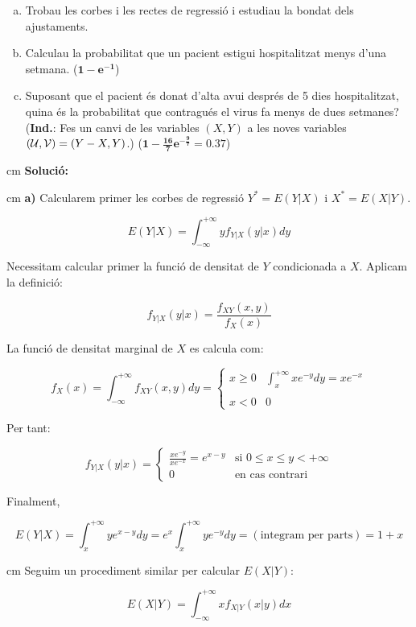 \documentclass{article}
\begin{document}
\begin{enumerate}[a)]
\item Trobau les corbes i les rectes de regressi\'o i estudiau la
bondat dels ajustaments.
\item Calculau la probabilitat que un pacient estigui hospitalitzat
menys d'una setmana. ($\mathbf{1-{ e}^{-1}}$)
\item Suposant que el pacient \'es donat d'alta avui despr\'es de 5 dies
hospitalitzat, quina \'es la probabilitat que contragu\'es el virus fa
menys de dues setmanes? ({\bf Ind.}: Fes un canvi de les variables
$(X,Y)$ a les noves variables $({\cal U},{\cal V}) = (Y - X, Y)$.)
($\mathbf{1-\frac{16}{7}e^{-\frac{9}{7}}=0.37}$)
\end{enumerate}


 cm
\noindent
\textbf{Soluci\'o:}

 cm
\noindent
\textbf{a)} Calcularem primer les corbes de regressi\'o $Y^*=E(Y|X)$ i
$X^*=E(X|Y)$.

\[
E(Y|X)= \int_{-\infty}^{+\infty} y f_{Y|X}(y|x) dy
\]

Necessitam calcular primer la funci\'o de densitat de $Y$ condicionada a $X$. Aplicam la definici\'o:

\[
f_{Y|X}(y|x)= \frac{ f_{XY}(x, y) }{f_X(x)}
\]

La funci\'o de densitat marginal de $X$ es calcula com:

\[
f_X(x)= \int_{-\infty}^{+\infty} f_{XY}(x, y) dy = 
\begin{cases} x \geq 0 & \int_x^{+\infty} x e^{-y} dy = x e^{-x} \\ \\
x < 0 & 0 \end{cases}
\]

Per tant:

\[
f_{Y|X}(y|x)= \begin{cases} \frac{ x e^{-y} } { x e^{-x} } = e^{x-y} & \text{si   } 0 \leq x \leq y < +\infty \\
0 & \text{en cas contrari}\end{cases}
\]

Finalment,

\[
E(Y|X)= \int_{x}^{+\infty} y e^{x-y} dy = e^x \int_{x}^{+\infty} y e^{-y} dy = (\text{integram per parts})=1+x
\]


 cm
Seguim un procediment similar per calcular $E(X|Y)$:

\[
E(X|Y)= \int_{-\infty}^{+\infty} x f_{X|Y}(x|y) dx
\]
\end{document}
